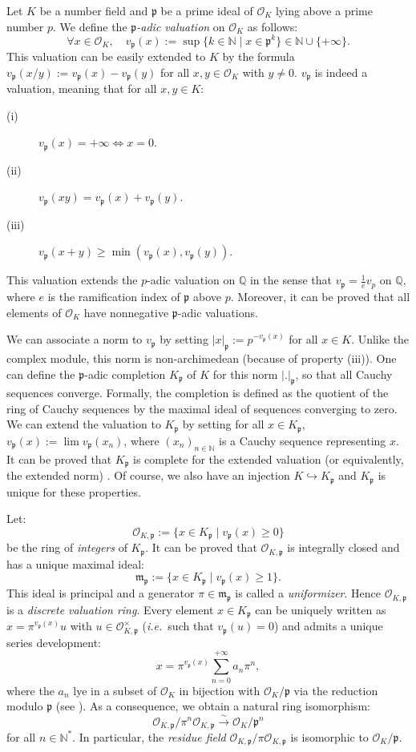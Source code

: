 \documentclass[a4paper,10pt,notitlepage]{report}
\theoremstyle{definition}
\theoremstyle{plain}
\theoremstyle{definition}
\newcommand{\ie}{\emph{i.e.}\ }
\newcommand{\N}{\mathbb{N}}
\newcommand{\Q}{\mathbb{Q}}
\newcommand{\mO}{\mathcal{O}}
\renewcommand{\(}{\left(}
\renewcommand{\)}{\right)}
\newcommand{\mf}[1]{\mathfrak{#1}}
\begin{document}
Let $K$ be a number field and $\mf{p}$ be a prime ideal of $\mO_K$ lying above a prime number $p$. We define the \emph{$\mf{p}$-adic valuation} on $\mO_K$ as follows:
\[\forall x\in\mO_K, \quad v_{\mf{p}}(x):=\sup\{k\in\N\mid x\in\mf{p}^k\}\in\N\cup\{+\infty\}.\]
This valuation can be easily extended to $K$ by the formula $v_{\mf{p}}(x/y):=v_{\mf{p}}(x)-v_{\mf{p}}(y)$ for all $x,y\in\mO_K$ with $y\neq 0$.  $v_{\mf{p}}$ is indeed a valuation, meaning that for all $x,y\in K$:
\begin{description}
\item[(i)] $v_{\mf{p}}(x)=+\infty\Longleftrightarrow x=0$.
\item[(ii)] $v_{\mf{p}}(xy)=v_{\mf{p}}(x)+v_{\mf{p}}(y)$.
\item[(iii)] $v_{\mf{p}}(x+y)\geq\min(v_{\mf{p}}(x),v_{\mf{p}}(y))$.
\end{description}
This valuation extends the $p$-adic valuation on $\Q$ in the sense that $v_{\mf{p}}=\frac{1}{e}v_p$ on $\Q$, where $e$ is the ramification index of $\mf{p}$ above $p$. Moreover, it can be proved that all elements of $\mO_K$ have nonnegative $\mf{p}$-adic valuations.  

We can associate a norm to $v_{\mf{p}}$ by setting $|x|_{\mf{p}}:=p^{-v_{\mf{p}}(x)}$ for all $x\in K$. Unlike the complex module, this norm is non-archimedean (because of property (iii)). One can define the $\mf{p}$-adic completion $K_{\mf{p}}$ of $K$ for this norm $|.|_{\mf{p}}$, so that all Cauchy sequences converge.  Formally, the completion is defined as the quotient of the ring of Cauchy sequences by the maximal ideal of sequences converging to zero. We can extend the valuation to $K_{\mf{p}}$ by setting for all $x\in K_{\mf{p}}$, $v_{\mf{p}}(x):=\lim v_{\mf{p}}(x_n)$, where $(x_n)_{n\in\N}$ is a Cauchy sequence representing $x$.  It can be proved that $K_{\mf{p}}$ is complete for the extended valuation (or equivalently, the extended norm) \cite[Theorem II.2.1]{Janusz}. Of course, we also have an injection $K\hookrightarrow K_{\mf{p}}$ and $K_{\mf{p}}$ is unique for these properties. 

Let:
\[\mO_{K,\mf{p}}:=\{x\in K_{\mf{p}}\mid v_{\mf{p}}(x)\geq 0\}\]
be the ring of \emph{integers} of $K_{\mf{p}}$. It can be proved that $\mO_{K,\mf{p}}$ is integrally closed and has a unique maximal ideal:
\[\mf{m}_{\mf{p}}:=\{x\in K_{\mf{p}}\mid v_{\mf{p}}(x)\geq 1\}.\]
This ideal is principal and a generator $\pi\in\mf{m}_{\mf{p}}$ is called a \emph{uniformizer}. Hence $\mO_{K,\mf{p}}$ is a \emph{discrete valuation ring}. Every element $x\in K_{\mf{p}}$ can be uniquely written as $x=\pi^{v_{\mf{p}}(x)}u$ with $u\in \mO_{K,\mf{p}}^\times$ (\ie such that $v_{\mf{p}}(u)=0$) and admits a unique series development:
\[x=\pi^{v_{\mf{p}}(x)}\sum_{n=0}^{+\infty} a_n\pi^n,\]
where the $a_n$ lye in a subset of $\mO_K$ in bijection with $\mO_K/\mf{p}$ via the reduction modulo $\mf{p}$ (see \cite[Proposition II.2.8]{Janusz}). As a consequence, we obtain a natural ring isomorphism:
\[\mO_{K,\mf{p}}/\pi^n\mO_{K,\mf{p}}\overset{\sim}{\longrightarrow}\mO_K/\mf{p}^n\]
for all $n\in\N^*$. In particular, the \emph{residue field} $\mO_{K,\mf{p}}/\pi\mO_{K,\mf{p}}$ is isomorphic to $\mO_K/\mf{p}$.
\end{document}
